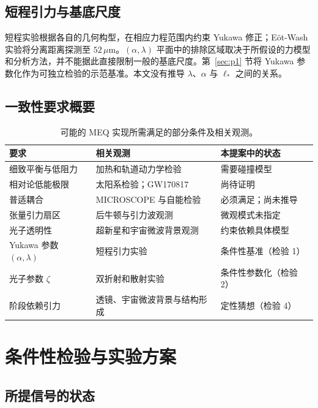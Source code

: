 \documentclass[UTF8,fontset=none,11pt,a4paper]{ctexart}
\begin{document}
\subsection{短程引力与基底尺度}\label{sec:shortrange}

短程实验根据各自的几何构型，在相应力程范围内约束 Yukawa 修正；Eöt-Wash 实验将分离距离探测至 $52\,\mu$m\cite{Lee2020}。$(\alpha,\lambda)$ 平面中的排除区域取决于所假设的力模型和分析方法，并不能据此直接限制一般的基底尺度。第~\ref{sec:p1} 节将 Yukawa 参数化作为可独立检验的示范基准。本文没有推导 $\lambda$、$\alpha$ 与 $\ell_\ast$ 之间的关系。

\subsection{一致性要求概要}

\begin{table}[htbp]
\centering\small
\caption{可能的 MEQ 实现所需满足的部分条件及相关观测。}
\begin{tabular}{@{}>{\raggedright\arraybackslash}p{}>{\raggedright\arraybackslash}p{}>{\raggedright\arraybackslash}p{}@{}}
\toprule
要求 & 相关观测 & 本提案中的状态 \\
\midrule
细致平衡与低阻力 & 加热和轨道动力学检验 & 需要碰撞模型 \\
相对论低能极限 & 太阳系检验；GW170817 & 尚待证明 \\
普适耦合 & MICROSCOPE 与自能检验 & 必须满足；尚未推导 \\
张量引力扇区 & 后牛顿与引力波观测 & 微观模式未指定 \\
光子透明性 & 超新星和宇宙微波背景观测 & 约束依赖具体模型 \\
Yukawa 参数 $(\alpha,\lambda)$ & 短程引力实验 & 条件性基准（检验 1） \\
光子参数 $\zeta$ & 双折射和散射实验 & 条件性参数化（检验 2） \\
阶段依赖引力 & 透镜、宇宙微波背景与结构形成 & 定性猜想（检验 4） \\
\bottomrule
\end{tabular}
\end{table}

\section{条件性检验与实验方案}\label{sec:pred}

\subsection{所提信号的状态}
\end{document}
